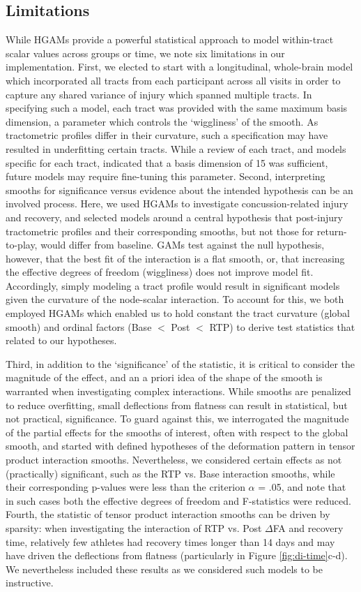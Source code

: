 \documentclass[]{imag-ms-template}
\begin{document}
\subsection{Limitations}
\label{ssec:disc-limit}
While HGAMs provide a powerful statistical approach to model within-tract scalar values across groups or time, we note six limitations in our implementation. First, we elected to start with a longitudinal, whole-brain model which incorporated all tracts from each participant across all visits in order to capture any shared variance of injury which spanned multiple tracts. In specifying such a model, each tract was provided with the same maximum basis dimension, a parameter which controls the `wiggliness' of the smooth. As tractometric profiles differ in their curvature, such a specification may have resulted in underfitting certain tracts. While a review of each tract, and models specific for each tract, indicated that a basis dimension of 15 was sufficient, future models may require fine-tuning this parameter. Second, interpreting smooths for significance versus evidence about the intended hypothesis can be an involved process. Here, we used HGAMs to investigate concussion-related injury and recovery, and selected models around a central hypothesis that post-injury tractometric profiles and their corresponding smooths, but not those for return-to-play, would differ from baseline. GAMs test against the null hypothesis, however, that the best fit of the interaction is a flat smooth, or, that increasing the effective degrees of freedom (wiggliness) does not improve model fit. Accordingly, simply modeling a tract profile would result in significant models given the curvature of the node-scalar interaction. To account for this, we both employed HGAMs which enabled us to hold constant the tract curvature (global smooth) and ordinal factors (Base $<$ Post $<$ RTP) to derive test statistics that related to our hypotheses.

Third, in addition to the `significance' of the statistic, it is critical to consider the magnitude of the effect, and an a priori idea of the shape of the smooth is warranted when investigating complex interactions. While smooths are penalized to reduce overfitting, small deflections from flatness can result in statistical, but not practical, significance. To guard against this, we interrogated the magnitude of the partial effects for the smooths of interest, often with respect to the global smooth, and started with defined hypotheses of the deformation pattern in tensor product interaction smooths. Nevertheless, we considered certain effects as not (practically) significant, such as the RTP vs. Base interaction smooths, while their corresponding p-values were less than the criterion $\alpha$ = .05, and note that in such cases both the effective degrees of freedom and F-statistics were reduced. Fourth, the statistic of tensor product interaction smooths can be driven by sparsity: when investigating the interaction of RTP vs. Post $\Delta$FA and recovery time, relatively few athletes had recovery times longer than 14 days and may have driven the deflections from flatness (particularly in Figure \ref{fig:di-time}c-d). We nevertheless included these results as we considered such models to be instructive.
\end{document}
